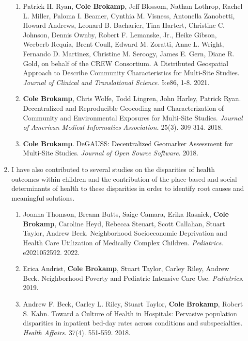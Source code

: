 \documentclass{nihbiosketch}
\begin{document}
\begin{enumerate}
\begin{enumerate}
\item Patrick H. Ryan, \textbf{Cole Brokamp}, Jeff Blossom, Nathan Lothrop,
  Rachel L. Miller, Paloma I. Beamer, Cynthia M. Visness, Antonella
  Zanobetti, Howard Andrews, Leonard B. Bacharier, Tina Hartert, Christine
  C. Johnson, Dennis Ownby, Robert F. Lemanske, Jr., Heike Gibson, Weeberb
  Requia, Brent Coull, Edward M. Zoratti, Anne L. Wright, Fernando D.
  Martinez, Christine M. Seroogy, James E. Gern, Diane R. Gold, on behalf
  of the CREW Consortium. A Distributed Geospatial Approach to Describe
  Community Characteristics for Multi-Site Studies. \textit{Journal of
    Clinical and Translational Science}. 5:e86, 1-8. 2021.

  \item \textbf{Cole Brokamp}, Chris Wolfe, Todd Lingren, John Harley, Patrick Ryan. Decentralized and Reproducible Geocoding and Characterization of Community and Environmental Exposures for Multi-Site Studies. \textit{Journal of American Medical Informatics Association.} 25(3). 309-314. 2018.
	
  \item \textbf{Cole Brokamp}. DeGAUSS: Decentralized Geomarker Assessment for Multi-Site Studies. \textit{Journal of Open Source Software}. 2018. 

\end{enumerate}

\item I have also contributed to several studies on the disparities of health outcomes within children and the contribution of the place-based and social determinants of health to these disparities in order to identify root causes and meaningful solutions.

\begin{enumerate}

  \item Joanna Thomson, Breann Butts, Saige Camara, Erika Rasnick, \textbf{Cole Brokamp}, Caroline Heyd, Rebecca Steuart, Scott Callahan, Stuart Taylor, Andrew Beck. Neighborhood Socioeconomic Deprivation and Health Care Utilization of Medically Complex Children. \textit{Pediatrics}. e2021052592. 2022.

  \item Erica Andrist, \textbf{Cole Brokamp}, Stuart Taylor, Carley Riley,
  Andrew Beck. Neighborhood Poverty and Pediatric Intensive Care Use.
  \textit{Pediatrics}. 2019.

	\item Andrew F. Beck, Carley L. Riley, Stuart Taylor, \textbf{Cole Brokamp},
    Robert S. Kahn. Toward a Culture of Health in Hospitals: Pervasive
    population disparities in inpatient bed-day rates across conditions and
    subspecialties. \textit{Health Affairs}. 37(4). 551-559. 2018.
		

\end{enumerate}
\end{enumerate}
\end{document}
